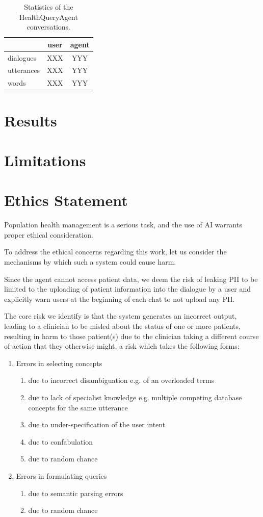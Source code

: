 \documentclass[11pt]{article}
\begin{document}
\begin{table}[t]
\centering
\begin{tabular}{|l|c|c|}
\hline
	& user & agent \\
\hline
	dialogues	& XXX & YYY \\
	utterances	& XXX & YYY \\
	words 		& XXX & YYY \\
\hline
\end{tabular}
\caption{Statistics of the HealthQueryAgent conversations.}
\label{tab:results}
\end{table}


\section{Results}

\section*{Limitations}

\section{Ethics Statement}
Population health management is a serious task, and the use of AI warrants proper ethical consideration.

To address the ethical concerns regarding this work, let us consider the mechanisms by which such a system could cause harm.

Since the agent cannot access patient data, we deem the risk of leaking PII to be limited to the uploading of patient information into the dialogue by a user and explicitly warn users at the beginning of each chat to not upload any PII.

The core risk we identify is that the system generates an incorrect output, leading to a clinician to be misled about the status of one or more patients, resulting in harm to those patient(s) due to the clinician taking a different course of action that they otherwise might, a risk which takes the following forms:

\begin{enumerate}
	\item Errors in selecting concepts
	\begin{enumerate}
		\item due to incorrect disambiguation e.g. of an overloaded terms
		\item due to lack of specialist knowledge e.g. multiple competing database concepts for the same utterance   
		\item due to under-specification of the user intent
		\item due to confabulation
		\item due to random chance
	\end{enumerate}
	\item Errors in formulating queries
	\begin{enumerate}
		\item due to semantic parsing errors 
		\item due to random chance
	\end{enumerate}
\end{enumerate}
\end{document}

